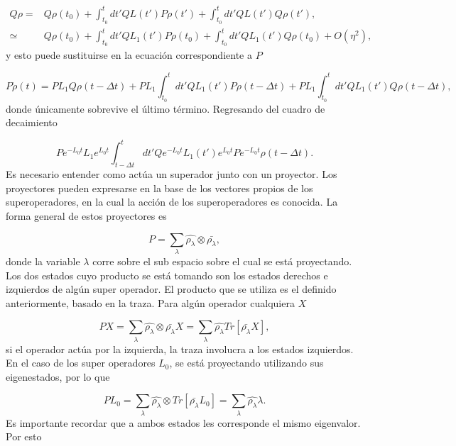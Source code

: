 \documentclass[a4paper,10pt]{report}
\begin{document}
\begin{align*}
Q\rho =& Q\rho(t_0) + \int_{t_0}^{t}dt' QL(t')P\rho(t')+\int_{t_0}^{t}dt'QL(t')Q\rho(t'),\\
\simeq & Q\rho(t_0) + \int_{t_0}^{t}dt' QL_1(t')P\rho(t_0)+\int_{t_0}^{t}dt'QL_1(t')Q\rho(t_0)+O(\eta^2),
\end{align*} y esto puede sustituirse en la ecuación correspondiente a $P$

\begin{equation}
P\dot{\rho}(t) = PL_1Q\rho(t-\Delta t) + PL_1\int_{t_0}^{t}dt' QL_1(t')P\rho(t-\Delta t) + PL_1\int_{t_0}^{t}dt'QL_1(t')Q\rho(t-\Delta t),
\end{equation} donde únicamente sobrevive el último término. Regresando del cuadro de decaimiento

\begin{equation}\label{ProyectionEQ}
P e^{-L_0 t}L_1e^{L_0 t}\int_{t-\Delta t}^{t}dt'Qe^{-L_0 t}L_1(t')e^{L_0 t}Pe^{-L_0 t}\rho(t-\Delta t).
\end{equation} Es necesario entender como actúa un superador junto con un proyector. Los proyectores pueden expresarse en la base de los vectores propios de los superoperadores, en la cual la acción de los superoperadores es conocida. La forma general de estos proyectores es

\begin{equation}
P = \sum_\lambda \hat{\rho_\lambda}\otimes\bar{\rho_\lambda},
\end{equation} donde la variable $\lambda$ corre sobre el sub espacio sobre el cual se está proyectando. Los dos estados cuyo producto se está tomando son los estados derechos e izquierdos de algún super operador. El producto que se utiliza es el definido anteriormente, basado en la traza. Para algún operador cualquiera $X$

\begin{equation}
PX=\sum_\lambda \hat{\rho_\lambda}\otimes\bar{\rho_\lambda}X = \sum_\lambda \hat{\rho_\lambda}Tr[\bar{\rho_\lambda}X],
\end{equation} si el operador actúa por la izquierda, la traza involucra a los estados izquierdos. En el caso de los super operadores $L_0$, se está proyectando utilizando sus eigenestados, por lo que

\begin{equation}
PL_0=\sum_\lambda \hat{\rho_\lambda}\otimes Tr[\bar{\rho_\lambda}L_0] = \sum_\lambda \hat{\rho_\lambda}\lambda.
\end{equation} Es importante recordar que a ambos estados les corresponde el mismo eigenvalor. Por esto
\end{document}
